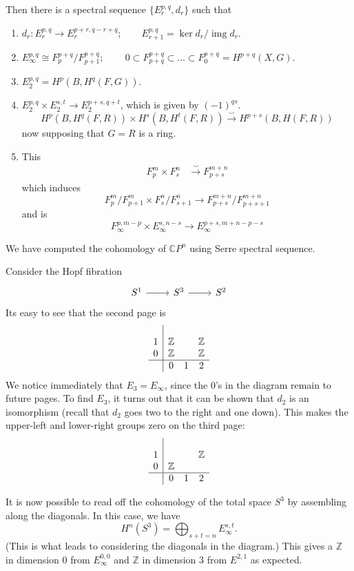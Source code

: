\documentclass{article}
\newcommand{\C}{\mathbb{C}}
\newcommand{\Z}{\mathbb{Z}}
\DeclareMathOperator{\img}{img}
\begin{document}
Then there is a spectral sequence $\{E_r^{p,q},d_r\}$ such that
\begin{enumerate}[label*=\alph*.]
	\item $d_r:E_r^{p,q}\to E_r^{p+r,q-r+q};\qquad E_{r+1}^{p,q}=\ker d_r/\img d_r$.
	\item $E_{\infty}^{p,q}\cong F^{p+q}_p/F^{p+q}_{p+1}$; $\qquad 0\subset F^{p+q}_{p+q}\subset\ldots\subset F^{p+q}_0=H^{p+q}(X,G)$.
	\item $E^{p,q}_2=H^p(B,H^{q}(F,G))$.
	\item $E^{p,q}_2\times E^{s,t}_2\to E^{p+s,q+t}_2$, which is given by $(-1)^{qs}$.
	\[H^p(B,H^q(F,R))\times H^s(B,H^t(F,R))\overset{\smile}{\to} H^{p+s}(B,H(F,R))\]
	now supposing that $G=R$ is a ring.
	\item This
	\begin{align*}
		F^m_p\times F^n_s&\overset{\smile}{\to}F^{m+n}_{p+s}
	\end{align*}
	which induces
	\[F^m_p/F^m_{p+1}\times F^n_s/F^n_{s+1}\to F^{m+n}_{p+s}/F^{m+n}_{p+s+1}\]
	and is
	\[F_\infty^{p,m-p}\times E_\infty^{s,n-s}\to E_{\infty}^{p+s,m+n-p-s}\]
\end{enumerate}
\begin{example}
	We have computed the cohomology of $\C P^n$ using Serre spectral sequence.
\end{example}

\begin{example}
	Consider the Hopf fibration
	\[\begin{tikzcd}
		S^1\arrow[r]&S^3\arrow[r]&S^2
	\end{tikzcd}\]
	Its easy to see that the second page is
	\begin{align*}
		\begin{array}{c|ccc}
			&&&\\
			1&\Z&&\Z\\
			0&\Z&&\Z\\
			\hline
			&0&1&2
		\end{array}
	\end{align*}
	We notice immediately that $E_3=E_\infty$, since the 0's in the diagram remain to future pages. To find $E_3$, {\color{orange}it turns out} that it can be shown that $d_2$ is an isomorphism (recall that $d_2$ goes two to the right and one down). {\color{orange}This makes the upper-left and lower-right groups zero} on the third page:
	\begin{align*}
		\begin{array}{c|ccc}
			&&&\\
			1&&&\Z\\
			0&\Z&&\\
			\hline
			&0&1&2
		\end{array}
	\end{align*}
	
	It is now possible to read off the cohomology of the total space $S^3$ by assembling along the diagonals. In this case, we have
	\[H^n(S^3)=\bigoplus_{s+t=n}E^{s,t}_\infty.\]
	(This is what leads to considering the diagonals in the diagram.) {\color{orange}This gives} a $\Z$ in dimension 0 from $E^{0,0}_\infty$ and $\Z$ in dimension $3$ from $E^{2,1}$ as expected.
\end{example}
\end{document}
